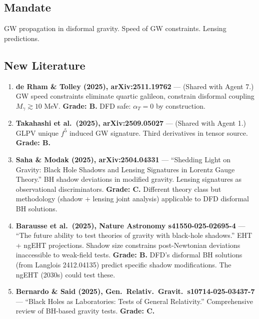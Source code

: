 \documentclass[11pt,a4paper]{article}
\begin{document}
\subsection{Mandate}
GW propagation in disformal gravity. Speed of GW constraints. Lensing predictions.

\subsection{New Literature}

\begin{enumerate}

\item \textbf{de Rham \& Tolley (2025), arXiv:2511.19762} --- (Shared with Agent 7.) GW speed constraints eliminate quartic galileon, constrain disformal coupling $M_\gamma \gtrsim 10$ MeV. \textbf{Grade: B.} DFD safe: $\alpha_T = 0$ by construction.

\item \textbf{Takahashi et al.\ (2025), arXiv:2509.05027} --- (Shared with Agent 1.) GLPV unique $f^5$ induced GW signature. Third derivatives in tensor source. \textbf{Grade: B.}

\item \textbf{Saha \& Modak (2025), arXiv:2504.04331} --- ``Shedding Light on Gravity: Black Hole Shadows and Lensing Signatures in Lorentz Gauge Theory.'' BH shadow deviations in modified gravity. Lensing signatures as observational discriminators. \textbf{Grade: C.} Different theory class but methodology (shadow + lensing joint analysis) applicable to DFD disformal BH solutions.

\item \textbf{Barausse et al.\ (2025), Nature Astronomy s41550-025-02695-4} --- ``The future ability to test theories of gravity with black-hole shadows.'' EHT + ngEHT projections. Shadow size constrains post-Newtonian deviations inaccessible to weak-field tests. \textbf{Grade: B.} DFD's disformal BH solutions (from Langlois 2412.04135) predict specific shadow modifications. The ngEHT (2030s) could test these.

\item \textbf{Bernardo \& Said (2025), Gen.\ Relativ.\ Gravit.\ s10714-025-03437-7} --- ``Black Holes as Laboratories: Tests of General Relativity.'' Comprehensive review of BH-based gravity tests. \textbf{Grade: C.}

\end{enumerate}
\end{document}
